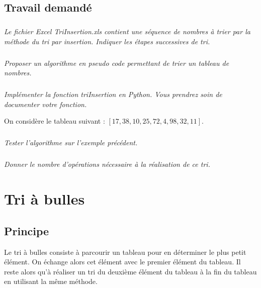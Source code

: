\documentclass[11pt,oneside]{article}
\begin{document}
\subsection{Travail demandé}


\subparagraph{}
\textit{Le fichier Excel \textsl{TriInsertion.xls} contient une séquence de nombres à trier par la méthode du tri par insertion. Indiquer les étapes successives de tri.}

\subparagraph{}
\textit{Proposer un algorithme en pseudo code permettant de trier un tableau de nombres. }


\subparagraph{}
\textit{Implémenter la fonction \textsf{triInsertion} en Python. Vous prendrez soin de documenter votre fonction.}

On considère le tableau suivant : $[17,38,10,25,72,4,98,32,11]$.

\subparagraph{}
\textit{Tester l'algorithme sur l'exemple précédent.}

\subparagraph{}
\textit{Donner le nombre d'opérations nécessaire à la réalisation de ce tri.}

\section{Tri à bulles}
\setcounter{subparagraph}{0}
\subsection{Principe}
Le tri à bulles consiste à parcourir un tableau pour en déterminer le plus petit élément. On échange alors cet élément avec le premier élément du tableau. Il reste alors qu'à réaliser un tri du deuxième élément du tableau à la fin du tableau en utilisant la même méthode. 
\end{document}
